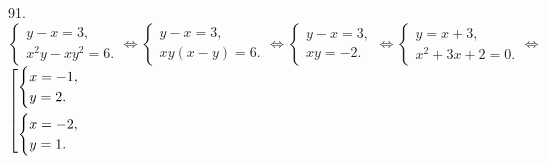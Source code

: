 91. $\begin{cases}
y-x=3,\\
x^2y-xy^2=6.
\end{cases}\Leftrightarrow\begin{cases}
y-x=3,\\
xy(x-y)=6.
\end{cases}\Leftrightarrow\begin{cases}
y-x=3,\\
xy=-2.
\end{cases}\Leftrightarrow
\begin{cases}
y=x+3,\\
x^2+3x+2=0.
\end{cases}\Leftrightarrow$\\$\left[
      \begin{gathered} \begin{cases}x=-1,\\ y=2.\end{cases}\hfill\\
      \begin{cases}x=-2,\\ y=1.\end{cases}\hfill \end{gathered}\right.$\\
